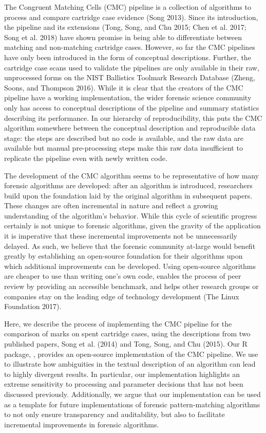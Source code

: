 The Congruent Matching Cells (CMC) pipeline is a collection of algorithms to process and compare cartridge case evidence (Song 2013).
Since its introduction, the pipeline and its extensions (Tong, Song, and Chu 2015; Chen et al. 2017; Song et al. 2018) have shown promise in being able to differentiate between matching and non-matching cartridge cases.
However, so far the CMC pipelines have only been introduced in the form of conceptual descriptions.
Further, the cartridge case scans used to validate the pipelines are only available in their raw, unprocessed forms on the NIST Ballistics Toolmark Research Database (Zheng, Soons, and Thompson 2016).
While it is clear that the creators of the CMC pipeline have a working implementation, the wider forensic science community only has access to conceptual descriptions of the pipeline and summary statistics describing its performance.
In our hierarchy of reproducibility, this puts the CMC algorithm somewhere between the conceptual description and reproducible data stage: the steps are described but no code is available, and the raw data are available but manual pre-processing steps make this raw data insufficient to replicate the pipeline even with newly written code.

The development of the CMC algorithm seems to be representative of how many forensic algorithms are developed: after an algorithm is introduced, researchers build upon the foundation laid by the original algorithm in subsequent papers.
These changes are often incremental in nature and reflect a growing understanding of the algorithm's behavior.
While this cycle of scientific progress certainly is not unique to forensic algorithms, given the gravity of the application it is imperative that these incremental improvements not be unnecessarily delayed.
As such, we believe that the forensic community at-large would benefit greatly by establishing an open-source foundation for their algorithms upon which additional improvements can be developed.
Using open-source algorithms are cheaper to use than writing one's own code, enables the process of peer review by providing an accessible benchmark, and helps other research groups or companies stay on the leading edge of technology development (The Linux Foundation 2017).

Here, we describe the process of implementing the CMC pipeline for the comparison of marks on spent cartridge cases, using the descriptions from two published papers, Song et al. (2014) and Tong, Song, and Chu (2015).
Our R package, , provides an open-source implementation of the CMC pipeline.
We use  to illustrate how ambiguities in the textual description of an algorithm can lead to highly divergent results.
In particular, our implementation highlights an extreme sensitivity to processing and parameter decisions that has not been discussed previously.
Additionally, we argue that our implementation can be used as a template for future implementations of forensic pattern-matching algorithms to not only ensure transparency and auditability, but also to facilitate incremental improvements in forensic algorithms.

